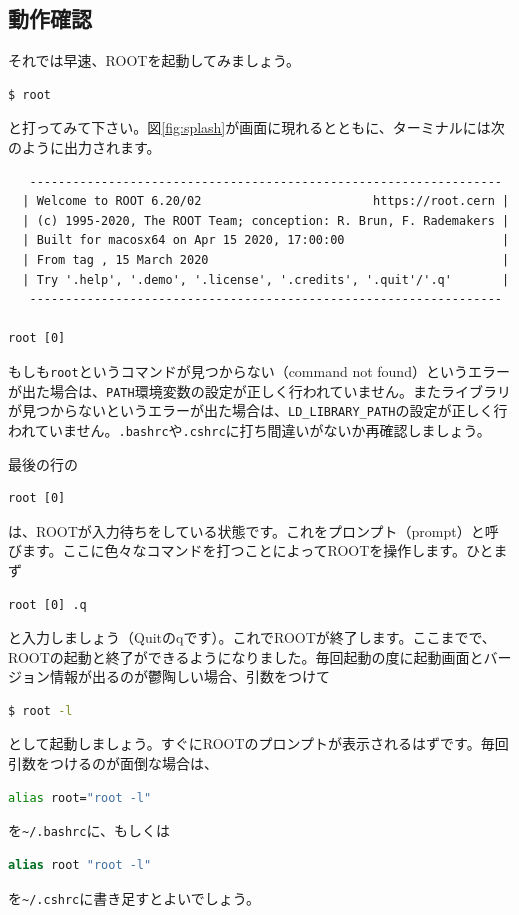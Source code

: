 {\subsection{動作確認}

それでは早速、ROOTを起動してみましょう。
\begin{lstlisting}[language=bash]
$ root
\end{lstlisting}
と打ってみて下さい。図\ref{fig:splash}が画面に現れるとともに、ターミナルには次のように出力されます。
\begin{lstlisting}
   ------------------------------------------------------------------
  | Welcome to ROOT 6.20/02                        https://root.cern |
  | (c) 1995-2020, The ROOT Team; conception: R. Brun, F. Rademakers |
  | Built for macosx64 on Apr 15 2020, 17:00:00                      |
  | From tag , 15 March 2020                                         |
  | Try '.help', '.demo', '.license', '.credits', '.quit'/'.q'       |
   ------------------------------------------------------------------

root [0] 
\end{lstlisting}
もしも\texttt{root}というコマンドが見つからない（command not found）というエラーが出た場合は、\texttt{PATH}環境変数の設定が正しく行われていません。またライブラリが見つからないというエラーが出た場合は、\texttt{LD\_LIBRARY\_PATH}の設定が正しく行われていません。\texttt{.bashrc}や\texttt{.cshrc}に打ち間違いがないか再確認しましょう。

最後の行の
\begin{lstlisting}
root [0]
\end{lstlisting}
は、ROOTが入力待ちをしている状態です。これをプロンプト（prompt）と呼びます。ここに色々なコマンドを打つことによってROOTを操作します。ひとまず
\begin{lstlisting}
root [0] .q
\end{lstlisting}
と入力しましょう（Quitのqです）。これでROOTが終了します。ここまでで、ROOTの起動と終了ができるようになりました。毎回起動の度に起動画面とバージョン情報が出るのが鬱陶しい場合、引数をつけて
\begin{lstlisting}[language=bash]
$ root -l
\end{lstlisting}
として起動しましょう。すぐにROOTのプロンプトが表示されるはずです。毎回引数をつけるのが面倒な場合は、
\begin{lstlisting}[language=bash]
alias root="root -l"
\end{lstlisting}
を\texttt{\~{}/.bashrc}に、もしくは
\begin{lstlisting}[language=csh]
alias root "root -l"
\end{lstlisting}
を\texttt{\~{}/.cshrc}に書き足すとよいでしょう。

}
